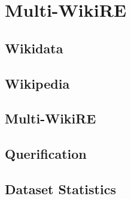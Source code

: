 \chapter{Multi-WikiRE}
\label{chpt:4}

\section{Wikidata}

\section{Wikipedia}

\section{Multi-WikiRE}

\section{Querification}

\section{Dataset Statistics}